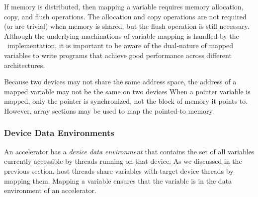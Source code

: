 If memory is distributed, then mapping a variable requires memory allocation,
copy, and flush operations.  The allocation and copy operations are not
required (or are trivial) when memory is shared, but the flush
operation is still necessary.  Although the underlying machinations of variable mapping
is handled by the \OMP\ implementation, it is important to be aware
of the dual-nature of mapped variables to write programs that 
achieve good performance across different architectures.  

Because two devices may not share the same address space,
the address of a mapped variable may not be the same on two devices
When a pointer variable is mapped, only the pointer is synchronized, not the
block of memory it points to.  However, array sections may be used to map the
pointed-to memory.



\subsubsection{Device Data Environments}
\label{ssec:06.device-data-environments}

An accelerator has a \emph{device data environment} that contains the set of
all variables currently accessible by threads running on that device.  As we
discussed in the previous section, host threads share variables with target
device threads by mapping them.  Mapping a variable ensures that the variable
is in the data environment of an accelerator.

